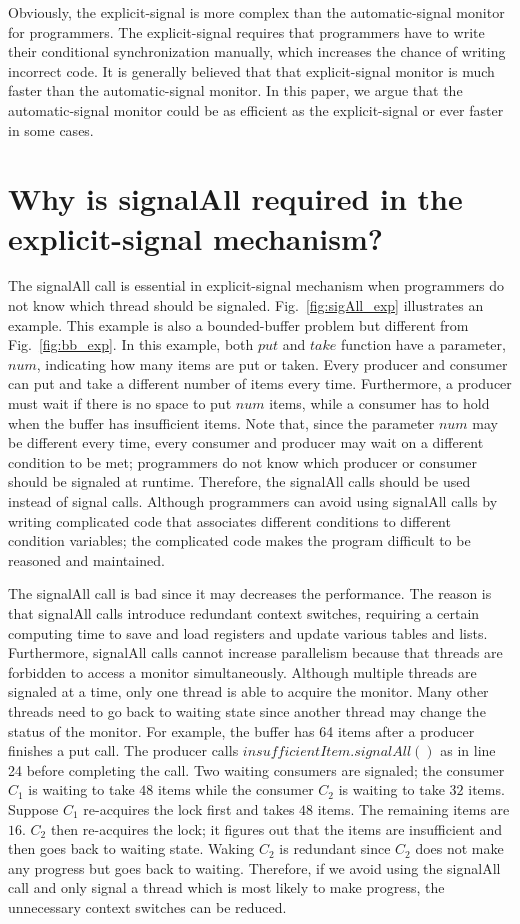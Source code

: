 \documentclass[preprint]{sigplanconf}
\begin{document}
Obviously, the explicit-signal is more complex than the automatic-signal monitor 
for programmers. The explicit-signal requires that programmers
have to write their conditional synchronization manually, which increases the 
chance of writing incorrect code. It is generally believed that that 
explicit-signal 
monitor is much faster than the automatic-signal monitor. In this paper, we 
argue that the automatic-signal monitor could be as efficient as the
explicit-signal or ever faster in some cases. 

\section{Why is signalAll required in the explicit-signal mechanism?} 
\label{sec:sigAll}
The signalAll call is essential in explicit-signal mechanism when programmers
do not know which thread should be signaled. Fig.~\ref{fig:sigAll_exp}
illustrates an example. This example is also a bounded-buffer problem but 
different from Fig.~\ref{fig:bb_exp}. In this example, both $put$ and $take$
function have a parameter, $num$, indicating how many items are put or taken. 
Every producer and consumer can put and take a different number of items
every time.  Furthermore, a producer must wait if there is no space to put
$num$ items, while a consumer has to hold when the buffer has insufficient items.
Note that, since the parameter $num$ may be different every time, every 
consumer and producer may wait on a different condition to be met; programmers 
do not know which producer or consumer should be signaled at runtime. 
Therefore, the signalAll calls should be used instead of signal calls.
Although programmers can avoid using signalAll calls by writing
complicated code that associates different conditions to different condition 
variables; the complicated code makes the program difficult to be reasoned and 
maintained. 

The signalAll call is bad since it may decreases the performance. The reason is 
that signalAll calls introduce redundant context switches, requiring a certain 
computing time to save and load registers and update various tables and lists.
Furthermore, signalAll calls cannot increase parallelism because that threads
are forbidden to access a monitor simultaneously. Although multiple threads are
signaled at a time, only one thread is able to acquire the monitor. Many other 
threads need to go back to waiting state since another thread may change the 
status of the monitor. For example, the buffer has 64 items after a producer 
finishes a put call. The producer calls $insufficientItem.signalAll()$ as in 
line 24 before completing the call. Two waiting consumers are signaled; the 
consumer $C_1$ is waiting to take $48$ items while the consumer $C_2$ is 
waiting to take 
$32$ items. Suppose $C_1$ re-acquires the lock first and takes $48$ items. The
remaining items are $16$. $C_2$ then re-acquires the lock; it figures out that
the items are insufficient and then goes back to waiting state. Waking $C_2$ is
redundant since $C_2$ does not make any progress but goes back to waiting.
Therefore, if we avoid using the signalAll call and only signal a thread which
is most likely to make progress, the unnecessary context switches can be
reduced.
\end{document}
